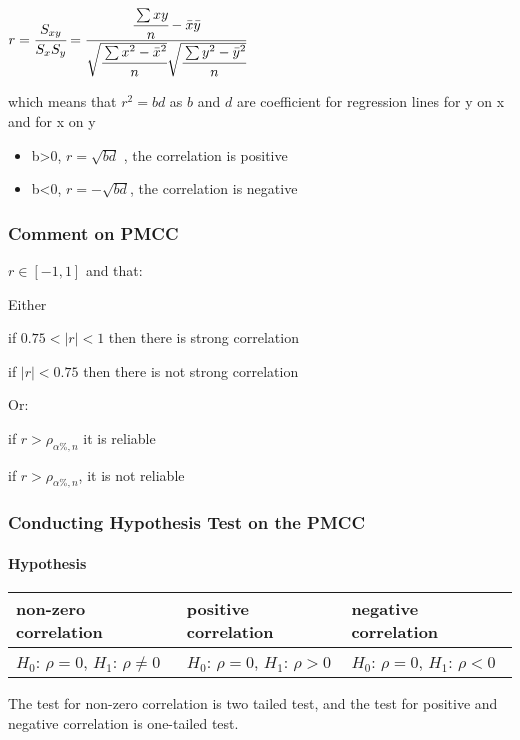 \documentclass[]{article}
\let\oldparagraph\paragraph
\renewcommand{\paragraph}[1]{\oldparagraph{#1}\mbox{}}
\begin{document}
\(r = \cfrac{S_{xy}}{S_x S_y} = \cfrac{\cfrac{\sum xy}{n} - \bar{x}\bar{y}}{\sqrt{\cfrac{\sum{x^2}-\bar{x}^2}{n}}\sqrt{\cfrac{\sum{y^2}-\bar{y}^2}{n}}}\)

which means that \(r^2 = bd\) as \(b\) and \(d\) are coefficient for
regression lines for y on x and for x on y

\begin{itemize}
\item
  b\textgreater{}0, \(r = \sqrt{bd}\) , the correlation is positive
\item
  b\textless{}0, \(r = -\sqrt{bd}\), the correlation is negative
\end{itemize}

\subsubsection{Comment on PMCC}\label{header-n403}

\(r \in [-1,1]\) and that:

Either

if \( 0.75 < |r| < 1\) then there is strong correlation

if \(|r| < 0.75\) then there is not strong correlation

Or:

if \(r > \rho_{\alpha\%, n}\) it is reliable

if \(r > \rho_{\alpha\%, n}\), it is not reliable

\subsubsection{Conducting Hypothesis Test on the
PMCC}\label{header-n411}

\paragraph{Hypothesis}\label{header-n412}

\begin{longtable}[]{@{}lll@{}}
\toprule
non-zero correlation & positive correlation & negative
correlation\tabularnewline
\midrule
\endhead
\(H_0\): \(\rho = 0\), \(H_1\): \(\rho \ne 0\) & \(H_0\): \(\rho = 0\),
\(H_1\): \(\rho > 0\) & \(H_0\): \(\rho = 0\), \(H_1\):
\(\rho < 0\)\tabularnewline
\bottomrule
\end{longtable}

The test for non-zero correlation is two tailed test, and the test for
positive and negative correlation is one-tailed test.
\end{document}
